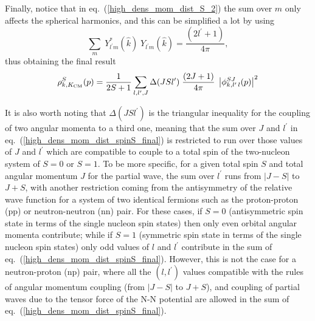 \documentclass[aps,twocolumn,showpacs,preprintnumbers,amsmath,amssymb,nofootinbib,superscriptaddress,showkeys,noeprint]{revtex4-1}
\begin{document}
Finally, notice that in eq.~(\ref{high_dens_mom_dist_S_2}) the sum
over $m$ only affects the spherical harmonics, and this can be
simplified a lot by using
\begin{equation}\label{completeness_spher_harm}
\sum_m\; Y^*_{l^\prime m}(\hat{k})\; Y_{l^\prime m}(\hat{k})=
\frac{(2l^\prime+1)}{4\pi}, 
\end{equation}
thus obtaining the final result
\begin{equation}\label{high_dens_mom_dist_spinS_final}
\rho^{S}_{k,K_{\rm CM}}(p)=\frac{1}{2S+1}\sum_{l,l^\prime,J}
\Delta(JSl^\prime)\;\frac{(2J+1)}{4\pi}\;
\left| \phi^{SJ}_{k, l^\prime\,l}(p)\right|^2
\end{equation}


It is also worth noting that $\Delta(JSl^\prime)$ is the triangular
inequality for the coupling of two angular momenta to a third one,
meaning that the sum over $J$ and $l^\prime$ in
eq.~(\ref{high_dens_mom_dist_spinS_final}) is restricted to run over
those values of $J$ and $l^\prime$ which are compatible to couple to a
total spin of the two-nucleon system of $S=0$ or $S=1$. To be more
specific, for a given total spin $S$ and total angular momentum $J$
for the partial wave, the sum over $l^\prime$ runs from $\left| J-S
\right|$ to $J+S$, with another restriction coming from the
antisymmetry of the relative wave function for a system of two
identical fermions such as the proton-proton (pp) or neutron-neutron
(nn) pair. For these cases, if $S=0$ (antisymmetric spin state in
terms of the single nucleon spin states) then only even orbital
angular momenta contribute; while if $S=1$ (symmetric spin state in
terms of the single nucleon spin states) only odd values of $l$ and
$l^\prime$ contribute in the sum of
eq.~(\ref{high_dens_mom_dist_spinS_final}).  However, this is not the
case for a neutron-proton (np) pair, where all the $(l,l^\prime)$
values compatible with the rules of angular momentum coupling (from
$\left| J-S \right|$ to $J+S$), and coupling of partial waves due to
the tensor force of the N-N potential are allowed in the sum of
eq.~(\ref{high_dens_mom_dist_spinS_final}).
\end{document}
